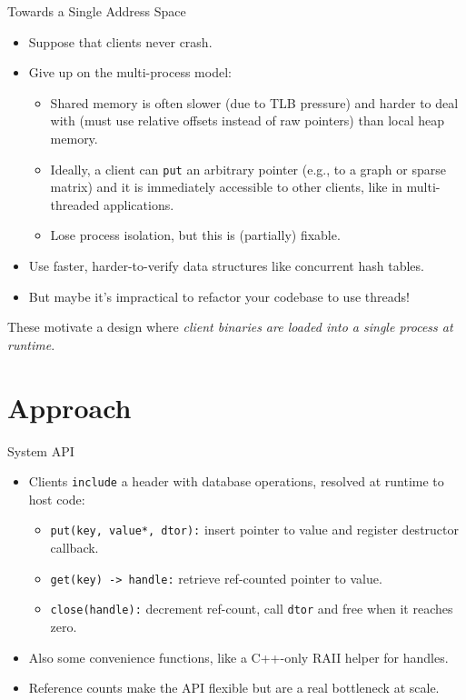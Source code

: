 \documentclass[10pt,aspectratio=169]{beamer}
\begin{document}
\begin{frame}{Towards a Single Address Space}
	\begin{itemize}
        \item Suppose that clients never crash.
        \item Give up on the multi-process model:
        \begin{itemize}
            \item Shared memory is often slower (due to TLB pressure) and harder
            to deal with (must use relative offsets instead of raw pointers)
            than local heap memory.
            \item Ideally, a client can \texttt{put} an arbitrary pointer (e.g.,
            to a graph or sparse matrix) and it is immediately accessible to
            other clients, like in multi-threaded applications.
            \item Lose process isolation, but this is (partially) fixable.
        \end{itemize}
        \item Use faster, harder-to-verify data structures like concurrent hash
        tables.
        \item But maybe it's impractical to refactor your codebase to use
        threads!
	\end{itemize}
	\vspace{1em}
	These motivate a design where \emph{client binaries are loaded into a single
    process at runtime}.
\end{frame}

\section{Approach}

\begin{frame}{System API}
    \begin{itemize}
        \item Clients \texttt{include} a header with database operations,
        resolved at runtime to host code:
        \begin{itemize}
            \item \texttt{put(key, value*, dtor):} insert pointer to value and
            register destructor callback.
            \item \texttt{get(key) -> handle:} retrieve ref-counted pointer to
            value.
            \item \texttt{close(handle):} decrement ref-count, call
            \texttt{dtor} and free when it reaches zero.
        \end{itemize}
        \item Also some convenience functions, like a C++-only RAII helper for
        handles.
        \item Reference counts make the API flexible but are a real bottleneck
        at scale.
    \end{itemize}
\end{frame}
\end{document}

